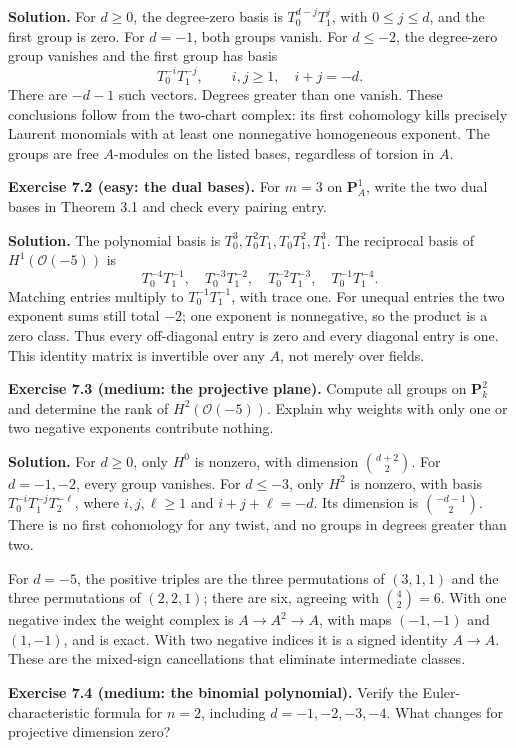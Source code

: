 \documentclass[11pt]{article}
\begin{document}
\textbf{Solution.} For \(d\ge0\), the degree-zero basis is
\(T_0^{d-j}T_1^j\), with \(0\le j\le d\), and the first group is zero.
For \(d=-1\), both groups vanish. For \(d\le-2\), the degree-zero group
vanishes and the first group has basis \[
T_0^{-i}T_1^{-j},\qquad i,j\ge1,\quad i+j=-d.
\] There are \(-d-1\) such vectors. Degrees greater than one vanish.
These conclusions follow from the two-chart complex: its first
cohomology kills precisely Laurent monomials with at least one
nonnegative homogeneous exponent. The groups are free \(A\)-modules on
the listed bases, regardless of torsion in \(A\).

\textbf{Exercise 7.2 (easy: the dual bases).} For \(m=3\) on
\(\mathbf P_A^1\), write the two dual bases in Theorem 3.1 and check
every pairing entry.

\textbf{Solution.} The polynomial basis is
\(T_0^3,T_0^2T_1,T_0T_1^2,T_1^3\). The reciprocal basis of
\(H^1(\mathcal O(-5))\) is \[
T_0^{-4}T_1^{-1},\quad T_0^{-3}T_1^{-2},\quad
T_0^{-2}T_1^{-3},\quad T_0^{-1}T_1^{-4}.
\] Matching entries multiply to \(T_0^{-1}T_1^{-1}\), with trace one.
For unequal entries the two exponent sums still total \(-2\); one
exponent is nonnegative, so the product is a zero class. Thus every
off-diagonal entry is zero and every diagonal entry is one. This
identity matrix is invertible over any \(A\), not merely over fields.

\textbf{Exercise 7.3 (medium: the projective plane).} Compute all groups
on \(\mathbf P_k^2\) and determine the rank of \(H^2(\mathcal O(-5))\).
Explain why weights with only one or two negative exponents contribute
nothing.

\textbf{Solution.} For \(d\ge0\), only \(H^0\) is nonzero, with
dimension \(\binom{d+2}{2}\). For \(d=-1,-2\), every group vanishes. For
\(d\le-3\), only \(H^2\) is nonzero, with basis
\(T_0^{-i}T_1^{-j}T_2^{-\ell}\), where \(i,j,\ell\ge1\) and
\(i+j+\ell=-d\). Its dimension is \(\binom{-d-1}{2}\). There is no first
cohomology for any twist, and no groups in degrees greater than two.

For \(d=-5\), the positive triples are the three permutations of
\((3,1,1)\) and the three permutations of \((2,2,1)\); there are six,
agreeing with \(\binom42=6\). With one negative index the weight complex
is \(A\to A^2\to A\), with maps \((-1,-1)\) and \((1,-1)\), and is
exact. With two negative indices it is a signed identity \(A\to A\).
These are the mixed-sign cancellations that eliminate intermediate
classes.

\textbf{Exercise 7.4 (medium: the binomial polynomial).} Verify the
Euler-characteristic formula for \(n=2\), including \(d=-1,-2,-3,-4\).
What changes for projective dimension zero?
\end{document}

